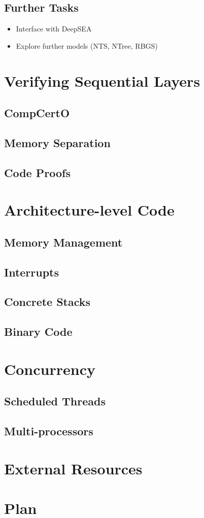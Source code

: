 \documentclass{report}
\begin{document}

\section{Further Tasks} %

\begin{itemize}
\item Interface with DeepSEA
\item Explore further models (NTS, NTree, RBGS)
\end{itemize}




\chapter{Verifying Sequential Layers} %

\section{CompCertO}
\section{Memory Separation}
\section{Code Proofs}

\chapter{Architecture-level Code}
\section{Memory Management}
\section{Interrupts}
\section{Concrete Stacks}
\section{Binary Code}

\chapter{Concurrency}
\section{Scheduled Threads}
\section{Multi-processors}


\chapter{External Resources}

\chapter{Plan}
\end{document}
